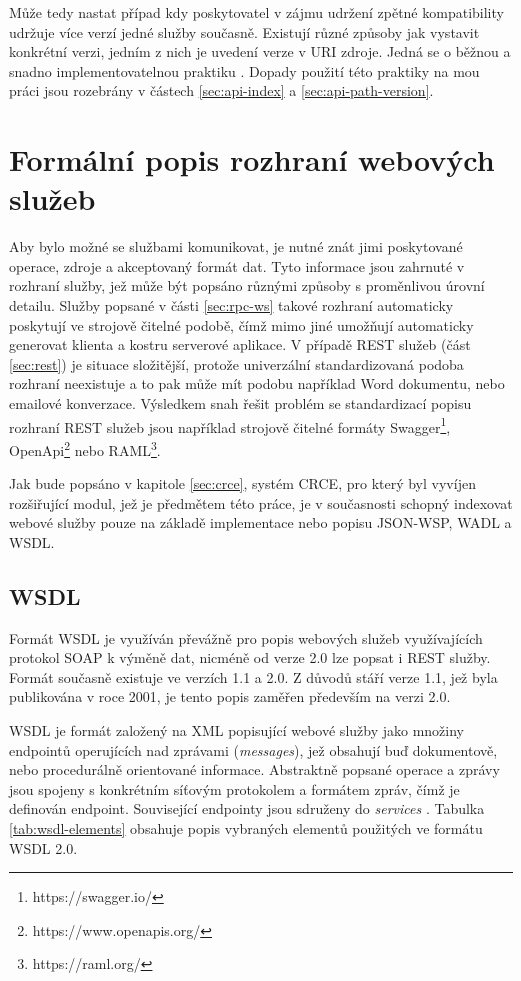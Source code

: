 \documentclass[czech,DP]{thesiskiv}
\begin{document}
Může tedy nastat případ kdy poskytovatel v zájmu udržení zpětné kompatibility udržuje více verzí jedné služby současně. Existují různé způsoby jak vystavit konkrétní verzi, jedním z nich je uvedení verze v URI zdroje. Jedná se o běžnou a snadno implementovatelnou praktiku  \cite{restApiVersion} \cite{restfulWebServices}. Dopady použití této praktiky na mou práci jsou rozebrány v částech \ref{sec:api-index} a \ref{sec:api-path-version}.


\section{Formální popis rozhraní webových služeb}
\label{sec:api-description-formats}

Aby bylo možné se službami komunikovat, je nutné znát jimi poskytované operace, zdroje a akceptovaný formát dat. Tyto informace jsou zahrnuté v rozhraní služby, jež může být popsáno různými způsoby s proměnlivou úrovní detailu. Služby popsané v části \ref{sec:rpc-ws} takové rozhraní automaticky poskytují ve strojově čitelné podobě, čímž mimo jiné umožňují automaticky generovat klienta a kostru serverové aplikace. V případě REST služeb (část \ref{sec:rest}) je situace složitější, protože univerzální standardizovaná podoba rozhraní neexistuje a to pak může mít podobu například Word dokumentu, nebo emailové konverzace. Výsledkem snah řešit problém se standardizací popisu rozhraní REST služeb jsou například strojově čitelné formáty Swagger\footnote{https://swagger.io/}, OpenApi\footnote{https://www.openapis.org/} nebo RAML\footnote{https://raml.org/}. 

Jak bude popsáno v kapitole \ref{sec:crce}, systém CRCE, pro který byl vyvíjen rozšiřující modul, jež je předmětem této práce, je v současnosti schopný indexovat webové služby pouze na základě implementace nebo popisu JSON-WSP, WADL a WSDL.

\subsection{WSDL}

Formát WSDL je využíván převážně pro popis webových služeb využívajících protokol SOAP k výměně dat, nicméně od verze 2.0 lze popsat i REST služby. Formát současně existuje ve verzích 1.1 a 2.0. Z důvodů stáří verze 1.1, jež byla publikována v roce 2001, je tento popis zaměřen především na verzi 2.0. 

WSDL je formát založený na XML popisující webové služby jako množiny endpointů operujících nad zprávami (\textit{messages}), jež obsahují buď dokumentově, nebo procedurálně orientované informace. Abstraktně popsané operace a zprávy jsou spojeny s konkrétním síťovým protokolem a formátem zpráv, čímž je definován endpoint. Související endpointy jsou sdruženy do \textit{services} \cite{wsdl2}. Tabulka \ref{tab:wsdl-elements} obsahuje popis vybraných elementů použitých ve formátu WSDL 2.0.
\end{document}
